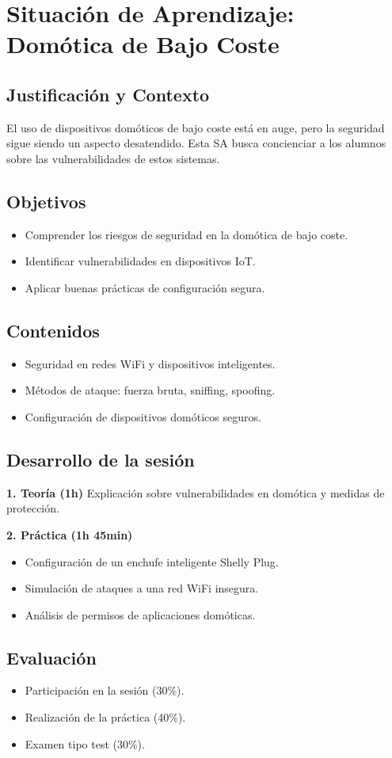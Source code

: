 \chapter{Situación de Aprendizaje: Domótica de Bajo Coste}
\section{Justificación y Contexto}
El uso de dispositivos domóticos de bajo coste está en auge, pero la seguridad sigue siendo un aspecto desatendido. Esta SA busca concienciar a los alumnos sobre las vulnerabilidades de estos sistemas.

\section{Objetivos}
\begin{itemize}
    \item Comprender los riesgos de seguridad en la domótica de bajo coste.
    \item Identificar vulnerabilidades en dispositivos IoT.
    \item Aplicar buenas prácticas de configuración segura.
\end{itemize}

\section{Contenidos}
\begin{itemize}
    \item Seguridad en redes WiFi y dispositivos inteligentes.
    \item Métodos de ataque: fuerza bruta, sniffing, spoofing.
    \item Configuración de dispositivos domóticos seguros.
\end{itemize}

\section{Desarrollo de la sesión}
\textbf{1. Teoría (1h)}  
Explicación sobre vulnerabilidades en domótica y medidas de protección.

\textbf{2. Práctica (1h 45min)}  
\begin{itemize}
    \item Configuración de un enchufe inteligente Shelly Plug.
    \item Simulación de ataques a una red WiFi insegura.
    \item Análisis de permisos de aplicaciones domóticas.
\end{itemize}

\section{Evaluación}
\begin{itemize}
    \item Participación en la sesión (30\%).
    \item Realización de la práctica (40\%).
    \item Examen tipo test (30\%).
\end{itemize}